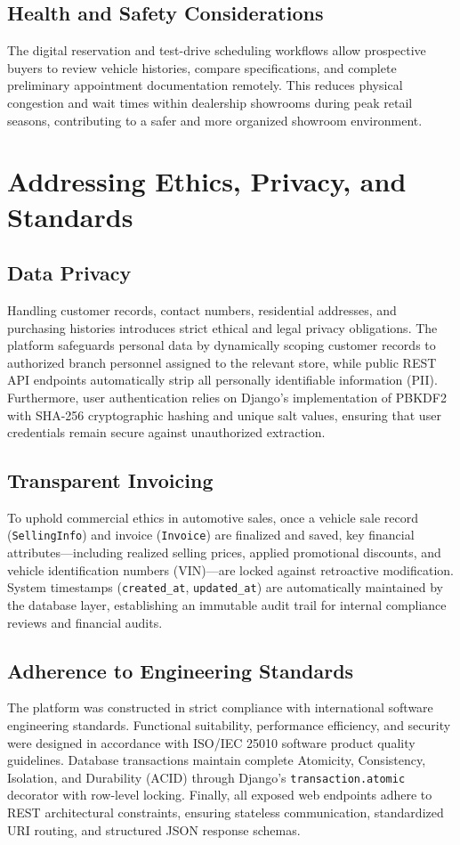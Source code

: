 \subsection{Health and Safety Considerations}
The digital reservation and test-drive scheduling workflows allow prospective buyers to review vehicle histories, compare specifications, and complete preliminary appointment documentation remotely. This reduces physical congestion and wait times within dealership showrooms during peak retail seasons, contributing to a safer and more organized showroom environment.

\section{Addressing Ethics, Privacy, and Standards}

\subsection{Data Privacy }
Handling customer records, contact numbers, residential addresses, and purchasing histories introduces strict ethical and legal privacy obligations. The platform safeguards personal data by dynamically scoping customer records to authorized branch personnel assigned to the relevant store, while public REST API endpoints automatically strip all personally identifiable information (PII). Furthermore, user authentication relies on Django's implementation of PBKDF2 with SHA-256 cryptographic hashing and unique salt values, ensuring that user credentials remain secure against unauthorized extraction.

\subsection{Transparent Invoicing}
To uphold commercial ethics in automotive sales, once a vehicle sale record (\texttt{SellingInfo}) and invoice (\texttt{Invoice}) are finalized and saved, key financial attributes—including realized selling prices, applied promotional discounts, and vehicle identification numbers (VIN)—are locked against retroactive modification. System timestamps (\texttt{created\_at}, \texttt{updated\_at}) are automatically maintained by the database layer, establishing an immutable audit trail for internal compliance reviews and financial audits.

\subsection{Adherence to Engineering Standards}
The platform was constructed in strict compliance with international software engineering standards. Functional suitability, performance efficiency, and security were designed in accordance with ISO/IEC 25010 software product quality guidelines. Database transactions maintain complete Atomicity, Consistency, Isolation, and Durability (ACID) through Django's \texttt{transaction.atomic} decorator with row-level locking. Finally, all exposed web endpoints adhere to REST architectural constraints, ensuring stateless communication, standardized URI routing, and structured JSON response schemas.
